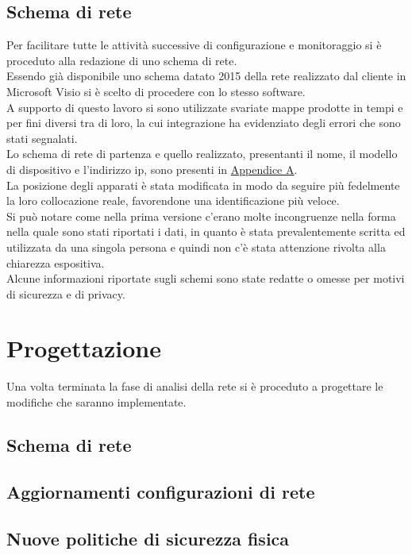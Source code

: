 \documentclass[Tesi.tex]{subfiles}
\begin{document}
\subsection{Schema di rete}
Per facilitare tutte le attività successive di configurazione e monitoraggio si è proceduto alla redazione di uno schema di rete. \\
Essendo già disponibile uno schema datato 2015 della rete realizzato dal cliente in Microsoft Visio si è scelto di procedere con lo stesso software. \\
A supporto di questo lavoro si sono utilizzate svariate mappe prodotte in tempi e per fini diversi tra di loro, la cui integrazione ha evidenziato degli errori che sono stati segnalati. \\
Lo schema di rete di partenza e quello realizzato, presentanti il nome, il modello di dispositivo e l'indirizzo ip, sono presenti in \hyperref[sec:Appendice A]{Appendice A}.\\
La posizione degli apparati è stata modificata in modo da seguire più fedelmente la loro collocazione reale, favorendone una identificazione più veloce. \\
Si può notare come nella prima versione c'erano molte incongruenze nella forma nella quale sono stati riportati i dati, in quanto è stata prevalentemente scritta ed utilizzata da una singola persona e quindi non c'è stata attenzione rivolta alla chiarezza espositiva. \\
Alcune informazioni riportate sugli schemi sono state redatte o omesse per motivi di sicurezza e di privacy. \\

\newpage
\section{Progettazione}

Una volta terminata la fase di analisi della rete si è proceduto a progettare le modifiche che saranno implementate. \\

\subsection{Schema di rete}
\subsection{Aggiornamenti configurazioni di rete}
\subsection{Nuove politiche di sicurezza fisica}
\end{document}
